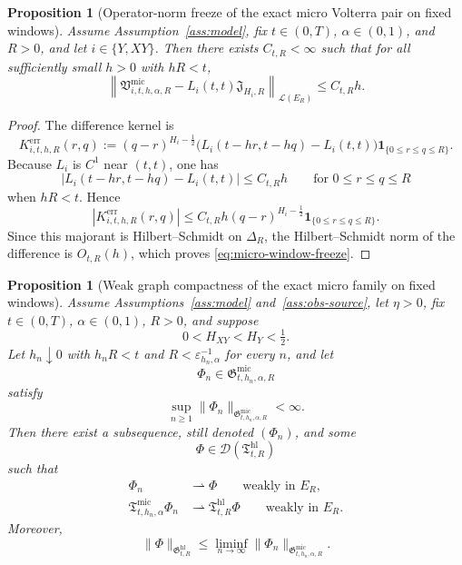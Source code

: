 \documentclass[11pt,a4paper]{amsart}
\theoremstyle{plain}
\newtheorem{proposition}[theorem]{Proposition}
\theoremstyle{definition}
\theoremstyle{remark}
\newcommand{\one}{\mathbf 1}
\begin{document}
\begin{proposition}[Operator-norm freeze of the exact micro Volterra pair on fixed windows]
\label{prop:micro-window-freeze}
Assume Assumption~\ref{ass:model}, fix \(t\in(0,T)\), \(\alpha\in(0,1)\), and \(R>0\), and let
\(i\in\{Y,XY\}\). Then there exists \(C_{t,R}<\infty\) such that for all sufficiently small \(h>0\)
with \(hR<t\),
\begin{equation}\label{eq:micro-window-freeze}
\left\|
\mathfrak V_{i,t,h,\alpha,R}^{\mathrm{mic}}
-L_i(t,t)\mathfrak J_{H_i,R}
\right\|_{\mathcal L(E_R)}
\le
C_{t,R}h.
\end{equation}
\end{proposition}

\begin{proof}
The difference kernel is
\[
K_{i,t,h,R}^{\mathrm{err}}(r,q)
:=
(q-r)^{H_i-\frac12}
\bigl(
L_i(t-hr,t-hq)-L_i(t,t)
\bigr)\one_{\{0\le r\le q\le R\}}.
\]
Because \(L_i\) is \(C^1\) near \((t,t)\), one has
\[
|L_i(t-hr,t-hq)-L_i(t,t)|\le C_{t,R}h
\qquad\text{for }0\le r\le q\le R
\]
when \(hR<t\). Hence
\[
|K_{i,t,h,R}^{\mathrm{err}}(r,q)|
\le
C_{t,R}h (q-r)^{H_i-\frac12}\one_{\{0\le r\le q\le R\}}.
\]
Since this majorant is Hilbert--Schmidt on \(\Delta_R\), the Hilbert--Schmidt norm of the
difference is \(O_{t,R}(h)\), which proves \eqref{eq:micro-window-freeze}.
\end{proof}

\begin{proposition}[Weak graph compactness of the exact micro family on fixed windows]
\label{prop:micro-window-compact}
Assume Assumptions~\ref{ass:model} and~\ref{ass:obs-source}, let \(\eta>0\), fix
\(t\in(0,T)\), \(\alpha\in(0,1)\), \(R>0\), and suppose
\[
0<H_{XY}<H_Y<\tfrac12.
\]
Let \(h_n\downarrow0\) with \(h_nR<t\) and \(R<\varepsilon_{h_n,\alpha}^{-1}\) for every \(n\), and
let
\[
\Phi_n\in \mathfrak G_{t,h_n,\alpha,R}^{\mathrm{mic}}
\]
satisfy
\[
\sup_{n\ge1}\|\Phi_n\|_{\mathfrak G_{t,h_n,\alpha,R}^{\mathrm{mic}}}<\infty.
\]
Then there exist a subsequence, still denoted \((\Phi_n)\), and some
\[
\Phi\in \mathcal D(\mathfrak T_{t,R}^{\mathrm{hl}})
\]
such that
\begin{align*}
\Phi_n &\rightharpoonup \Phi
\qquad\text{weakly in }E_R, \\
\mathfrak T_{t,h_n,\alpha}^{\mathrm{mic}}\Phi_n
&\rightharpoonup
\mathfrak T_{t,R}^{\mathrm{hl}}\Phi
\qquad\text{weakly in }E_R.
\end{align*}
Moreover,
\[
\|\Phi\|_{\mathfrak G_{t,R}^{\mathrm{hl}}}
\le
\liminf_{n\to\infty}
\|\Phi_n\|_{\mathfrak G_{t,h_n,\alpha,R}^{\mathrm{mic}}}.
\]
\end{proposition}
\end{document}
